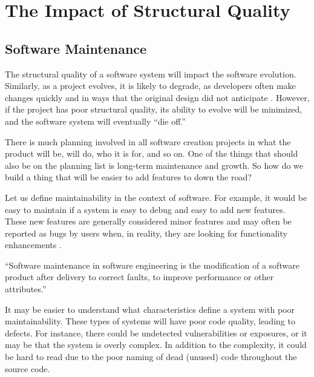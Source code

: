 
\section{The Impact of Structural Quality} \label{sectionMyIdea}

\subsection{Software Maintenance} \label{subSoftwareMaintenance}

The structural quality of a software system will impact the software evolution. Similarly, as a project evolves, it is likely to degrade, as developers often make changes quickly and in ways that the original design did not anticipate \cite{martin:2000}. However, if the project has poor structural quality, its ability to evolve will be minimized, and the software system will eventually ``die off.''

There is much planning involved in all software creation projects in what the product will be, will do, who it is for, and so on. One of the things that should also be on the planning list is long-term maintenance and growth. So how do we build a thing that will be easier to add features to down the road?

Let us define maintainability in the context of software. For example, it would be easy to maintain if a system is easy to debug and easy to add new features. These new features are generally considered minor features and may often be reported as bugs by users when, in reality, they are looking for functionality enhancements \cite{wiki:software-maintenance}.

\vspace{0.25cm}
\begin{displayquote}
  ``Software maintenance in software engineering is the modification of a software product after delivery to correct faults, to improve performance or other attributes.'' \cite{wiki:software-maintenance}
\end{displayquote}
\vspace{0.25cm}

It may be easier to understand what characteristics define a system with poor maintainability. These types of systems will have poor code quality, leading to defects. For instance, there could be undetected vulnerabilities or exposures, or it may be that the system is overly complex. In addition to the complexity, it could be hard to read due to the poor naming of dead (unused) code throughout the source code.

